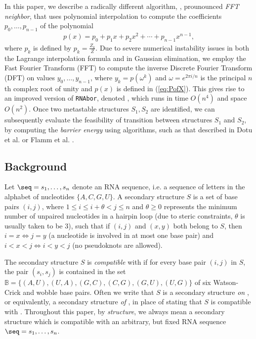 In this paper, we describe a radically different algorithm, \fftbor,
prounounced {\em FFT neighbor},
that uses polynomial interpolation to compute the
coefficients $p_0,\ldots,p_{n-1}$ of the polynomial
\begin{eqnarray}
\label{eq:PofX}
p(x) = p_0 + p_1 x + p_2 x^2 + \cdots + p_{n-1} x^{n-1},
\end{eqnarray}
where $p_k$ is defined by $p_k = \frac{Z_k}{Z}$.
Due to severe numerical instability issues in both the Lagrange
interpolation formula and in Gaussian elimination, we employ
the Fast Fourier Transform (FFT) to compute the inverse Discrete Fourier
Transform (DFT) on values $y_0,\ldots,y_{n-1}$, where $y_k = p(\omega^k)$ and
$\omega = e^{2 \pi i/n}$ is the principal $n$th complex root of unity and
$p(x)$ is defined in (\ref{eq:PofX}). This
gives rise to an improved version of {\tt RNAbor}, denoted \fftbor,
which runs in time $O(n^4)$ and space $O(n^2)$.
Once two metastable structures $S_1,S_2$ are identified, we can
subsequently evaluate the feasibility of transition between
structures $S_1$ and $S_2$,
by computing the {\em barrier energy} using algorithms, such as that
described in Dotu et al.  \cite{Dotu.nar10} or Flamm et al.
\cite{Flamm.r01}.





\subsection*{Background}

Let $\seq = s_1,\ldots,s_n$ denote an RNA sequence, i.e. a sequence
of letters in the alphabet of nucleotides $\{A,C,G,U\}$. A
secondary structure $S$ is a set of base pairs
$(i,j)$, where $1 \le i \le i+\theta < j \le n$ and $\theta \ge 0$
represents the minimum number of unpaired nucleotides in a hairpin loop
(due to steric constraints, $\theta$ is usually taken to be $3$),
such that if $(i,j)$ and $(x,y)$ both belong to $S$, then $i=x \iff j=y$
(a nucleotide is involved in at most one base pair)
and $i<x<j \iff i<y<j$ (no pseudoknots are allowed).

The secondary structure $S$ is {\em compatible}
with \seq if for every base pair $(i,j)$ in $S$, the pair
$(s_i,s_j)$ is contained in the set
$\mathbb{B} = \{(A,U), (U,A), (G,C), (C,G), (G,U), (U,G)\}$
of six Watson-Crick and wobble base pairs. Often we write that
$S$ is a secondary structure {\em on} \seq, or equivalently,
a secondary structure {\em of} \seq,
in place of stating that $S$ is compatible with \seq.
Throughout this paper, by {\em structure}, we always mean a
secondary structure which is compatible with an arbitrary, but fixed
RNA sequence $\seq=s_1,\ldots,s_n$.

